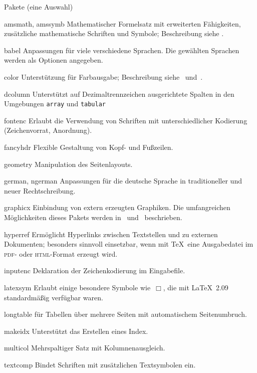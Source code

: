 \begin{table}[htbp]
\caption{Pakete (eine Auswahl)}\label{pack}
\oben{11cm}
\begin{ttdescription}%
\setlength{\itemsep}{.5\itemsep plus1pt minus1pt}
\item[amsmath, amssymb] Mathematischer Formelsatz mit erweiterten Fähigkeiten,
  zusätzliche mathematische Schriften und Symbole; Beschreibung siehe
  \cite{ch8}.
\item[babel] Anpassungen für viele verschiedene Sprachen. Die
  gewählten Sprachen werden als Optionen angegeben.
\item[color] Unterstützung für Farbausgabe;
  Beschreibung  siehe~\cite{grfguide} und~\cite{grfcomp}.
\item[dcolumn] Unterstützt auf Dezimaltrennzeichen ausgerichtete
  Spalten in den Umgebungen \texttt{array} und \texttt{tabular}
\item[fontenc] Erlaubt die Verwendung von Schriften mit
  unterschiedlicher Kodierung (Zeichenvorrat, Anordnung).
\item[fancyhdr] Flexible Gestaltung von Kopf- und Fußzeilen.
\item[geometry] Manipulation des Seitenlayouts.
\item[german, ngerman] Anpassungen für die deutsche Sprache in
  traditioneller und neuer Rechtschreibung.
\item[graphicx] Einbindung von extern erzeugten Graphiken.
  Die umfangreichen Möglichkeiten dieses Pakets werden 
  in~\cite{grfguide} und~\cite{grfcomp} beschrieben.
\item[hyperref] Ermöglicht Hyperlinks zwischen Textstellen und zu
  externen Dokumenten; besonders sinnvoll einsetzbar, 
  wenn mit \TeX\ eine Ausgabedatei im \textsc{pdf}- oder \textsc{html}-Format 
  erzeugt wird.
\item[inputenc] Deklaration der Zeichenkodierung im
  Eingabefile.
\item[latexsym] Erlaubt einige besondere Symbole wie~\(\Box\),
  die mit \LaTeX~2.09 standardmäßig verfügbar waren.
\item[longtable]
  für Tabellen über mehrere Seiten mit automatischem Seitenumbruch.
\item[makeidx] Unterstützt das Erstellen eines Index.
\item[multicol] Mehrspaltiger Satz mit Kolumnenausgleich.
\item[textcomp] Bindet Schriften mit zusätzlichen Textsymbolen ein.
\end{ttdescription}
\unten
\end{table}


